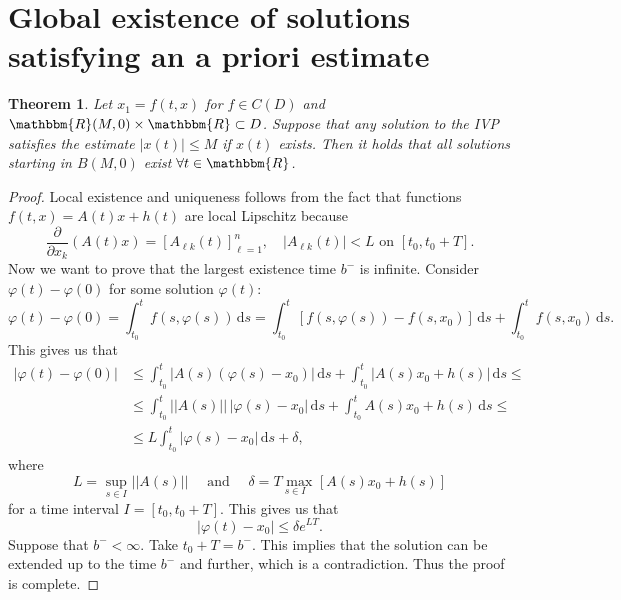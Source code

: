 \documentclass[12pt, a4paper]{article}
\newcommand{\R}{\ensuremath{\mathbbm{R}}}
\newcommand{\rd}{\ensuremath{\mathrm{d}}}
\newcommand{\id}{\ensuremath{\,\rd}}
\newtheorem{theorem}{Theorem}[section]
\begin{document}
\section{Global existence of solutions
satisfying an a priori estimate}
\begin{theorem}
Let $x_1 = f(t,x)$ for $f\in C(D)$ and $\R(M,0) \times \R\subset D$. Suppose that any solution to the IVP satisfies the estimate $|x(t)|\leq M$ if $x(t)$ exists. Then it holds that all solutions starting in $B(M,0)$ exist $\forall t\in\R$.
\end{theorem}
\begin{proof}
Local existence and uniqueness follows from the fact that functions $f(t,x)=A(t)x+h(t)$ are local Lipschitz because
\begin{equation*}
\frac{\partial}{\partial x_k} \left(A(t)x\right) = \left[A_{\ell k}(t)\right]_{\ell=1}^n, \quad |A_{\ell k}(t)|< L \text{ on } [t_0,t_0+T].
\end{equation*}
Now we want to prove that the largest existence time $b^{-}$ is infinite. Consider $\varphi(t)-\varphi(0)$ for some solution $\varphi(t)$:
\begin{equation*}
\varphi(t) - \varphi(0) = \int_{t_0}^t f(s,\varphi(s))\id s = \int_{t_0}^t \left[ f(s,\varphi(s)) -f(s,x_0) \right] \id s + \int_{t_0}^t f(s,x_0) \id s.
\end{equation*}
This gives us that
\begin{equation*}
\begin{split}
|\varphi(t)-\varphi(0)| &\leq \int_{t_0}^t \left|A(s)(\varphi(s)-x_0)\right|\id s + \int_{t_0}^t |A(s)x_0 + h(s)|\id s \leq \\
& \leq \int_{t_0}^t ||A(s)||\, |\varphi(s)-x_0| \id s + \int_{t_0}^t A(s)x_0 + h(s) \id s \leq \\
& \leq L\int_{t_0}^t |\varphi(s)-x_0|\id s + \delta,
\end{split}
\end{equation*}
where
\begin{equation*}
L =  \underset{s\in I}{\text{ sup }} ||A(s)|| \quad \text{ and } \quad  \delta = \underset{s\in I}{T \text{ max }} [A(s)x_0 + h(s)]
\end{equation*}
for a time interval $I = [t_0, t_0+T]$. This gives us that
\begin{equation*}
|\varphi(t)-x_0| \leq \delta e^{LT}.
\end{equation*}
Suppose that $b^{-}<\infty$. Take $t_0+T=b^-$. This implies that the solution can be extended up to the time $b^-$ and further, which is a contradiction. Thus the proof is complete.
\end{proof}
\end{document}
